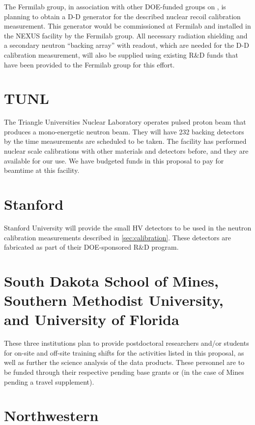 The Fermilab group, in association with other DOE-funded groups on \SuperCDMS, is planning to obtain a D-D generator for the described nuclear recoil calibration measurement. This generator would be commissioned at Fermilab and installed in the NEXUS facility by the Fermilab group.  All necessary radiation shielding and a secondary neutron “backing array” with readout, which are needed for the D-D calibration measurement, will also be supplied using existing R\&D funds that have been provided to the Fermilab \SuperCDMS group for this effort.   

\section{TUNL}

The Triangle Universities Nuclear Laboratory operates pulsed proton beam that produces a mono-energetic neutron beam. They will have 232 backing detectors by the time \SuperCDMS measurements are scheduled to be taken. The facility has performed nuclear scale calibrations with other materials and detectors before, and they are available for our use.  We have budgeted funds in this proposal to pay for beamtime at this facility.

\section{Stanford}
Stanford University will provide the small HV detectors to be used in the neutron calibration measurements described in \ref{sec:calibration}.  These detectors are fabricated as part of their DOE-sponsored \SuperCDMS R\&D program.

\section{South Dakota School of Mines, Southern Methodist University, and University of Florida}
These three institutions plan to provide postdoctoral researchers and/or students for on-site and off-site training shifts for the activities listed in this proposal, as well as further the science analysis of the data products. These personnel are to be funded through their respective pending base grants or (in the case of Mines pending a travel supplement).

\section{Northwestern}

